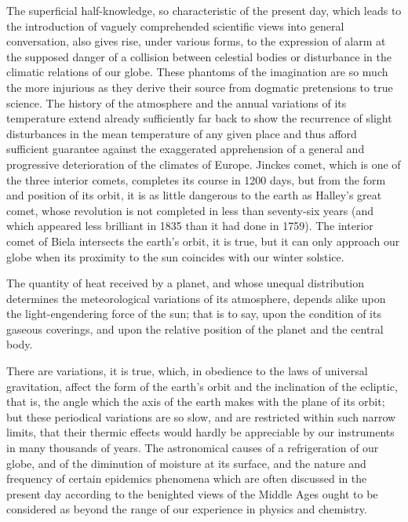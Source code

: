 The superficial half-knowledge, so characteristic of the present day, which leads to the introduction of vaguely comprehended scientific views into general conversation, also gives rise, under various forms, to the expression of alarm at the supposed danger of a collision between celestial bodies or disturbance in the climatic relations of our globe. These phantoms of the imagination are so much the more injurious as they derive their source from dogmatic pretensions to true science. The history of the atmosphere and the annual variations of its temperature extend already sufficiently far back to show the recurrence of slight disturbances in the mean temperature of any given place and thus afford sufficient guarantee against the exaggerated apprehension of a general and progressive deterioration of the climates of Europe. Jinckes comet, which is one of the three interior comets, completes its course in 1200 days, but from the form and position of its orbit, it is as little dangerous to the earth as Halley's great comet, whose revolution is not completed in less than seventy-six years (and which appeared less brilliant in 1835 than it had done in 1759). The interior comet of Biela intersects the earth's orbit, it is true, but it can only approach our globe when its proximity to the sun coincides with our winter solstice.

The quantity of heat received by a planet, and whose unequal distribution determines the meteorological variations of its atmosphere, depends alike upon the light-engendering force of the sun; that is to say, upon the condition of its gaseous coverings, and upon the relative position of the planet and the central body.

There are variations, it is true, which, in obedience to the laws of universal gravitation, affect the form of the earth's orbit and the inclination of the ecliptic, that is, the angle which the axis of the earth makes with the plane of its orbit; but these periodical variations are so slow, and are restricted within such narrow limits, that their thermic effects would hardly be appreciable by our instruments in many thousands of years. The astronomical causes of a refrigeration of our globe, and of the diminution of moisture at its surface, and the nature and frequency of certain epidemics phenomena which are often discussed in the present day according to the benighted views of the Middle Ages ought to be considered as beyond the range of our experience in physics and chemistry.

